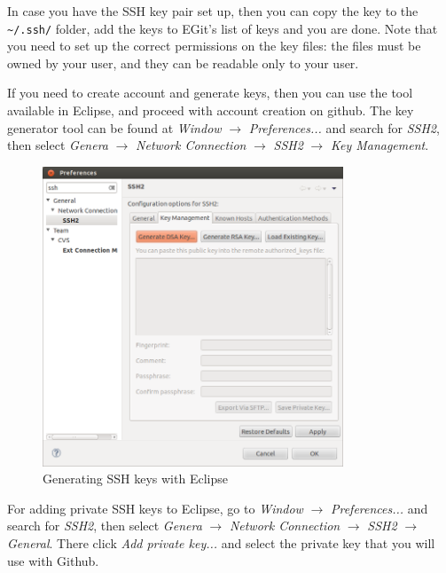 \documentclass[a4paper, 10pt]{article}
\begin{document}
In case you have the SSH key pair set up, then you can copy the key to
the \verb+~/.ssh/+ folder,
add the keys to EGit's list of keys and you are done.
Note that you need to set up the correct permissions on the key files:
the files must be owned by your user, and they can be readable only to
your user.

If you need to create account and generate keys, then you can use the
tool available in Eclipse, and proceed with account creation on github.
The key generator tool can be found at
\emph{Window} $\rightarrow$ \emph{Preferences...}
and search for \emph{SSH2}, then select
\emph{Genera} $\rightarrow$ \emph{Network Connection} $\rightarrow$
\emph{SSH2} $\rightarrow$ \emph{Key Management}.

    \begin{figure}[H]
    \centering
        \includegraphics[width=0.8\textwidth]{./install-guide-linux-images/auth-generate.png}
        \caption{Generating SSH keys with Eclipse}
        \label{fig:auth-generate}
    \end{figure}

For adding private SSH keys to Eclipse, go to
\emph{Window} $\rightarrow$ \emph{Preferences...}
and search for \emph{SSH2}, then select
\emph{Genera} $\rightarrow$ \emph{Network Connection} $\rightarrow$
\emph{SSH2} $\rightarrow$ \emph{General}.
There click \emph{Add private key...} and select the private key that you
will use with Github.
\end{document}
